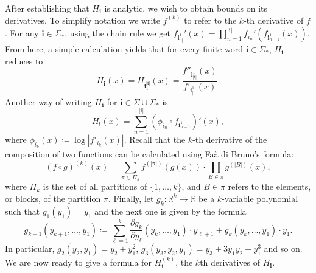 \documentclass[11pt,a4paper]{article}
\theoremstyle{definition}
\theoremstyle{remark}
\renewcommand{\Bbb}[1]{\mathbb{#1}}
\newcommand{\bbR}{{\Bbb R}}        %
\newcommand{\0}{\mathbf{0}}
\newcommand{\bi}{\mathbf{i}}
\numberwithin{equation}{section}
\begin{document}
After establishing that $H_{\bi}$ is analytic, we wish to obtain bounds on its derivatives. To
simplify notation we write $f^{(k)}$ to refer to the $k$-th derivative of $f$. 
For any $\bi\in\Sigma_*$, using the chain rule we get $f_{\bi_{|\bi|}^1}'(x)=
\prod_{n=1}^{|\bi|}f_{i_n}'(f_{\bi_{n-1}^1}(x))$. From here, a simple calculation yields %
that for every finite word $\bi\in\Sigma_*$, $H_{\bi}$ reduces to
\begin{equation}\label{eq:H=f''/f'}
  H_{\bi}(x)=H_{\bi_1^{|\bi|}}(x) = \frac{f''_{\bi_{|\bi|}^1}(x)}{f'_{\bi_{|\bi|}^1}(x)}.
\end{equation}
Another way of writing $H_{\bi}$ for $\bi\in\Sigma\cup\Sigma_*$ is
\begin{equation}
  H_{\bi}(x) = \sum_{n=1}^{|\bi|} (\phi_{i_n}\circ f_{\bi_{n-1}^1})'(x),
  \label{eq:alternativeH}
\end{equation}
where $\phi_{i_k}(x)\coloneqq \log|f'_{i_k}(x)|$. Recall that the $k$-th derivative of the
composition of two functions can be calculated using Fa\`a di Bruno's formula:
\begin{equation}\label{eq:FaaDiBruno}
  (f\circ g)^{(k)}(x) = \sum_{\pi\in \Pi_k} f^{(|\pi|)}(g(x)) \cdot \prod_{B\in\pi}
  g^{(|B|)}(x),
\end{equation}
where $\Pi_k$ is the set of all partitions of $\{1,\dots,k\}$, and $B\in \pi$ refers to the
elements, or blocks, of the partition $\pi$. Finally, let $g_k:\bbR^k\to \bbR$ be a $k$-variable
polynomial such that $g_1(y_1)=y_1$ and the next one is given by the formula
\[
g_{k+1}(y_{k+1},\dots,y_1)\coloneqq \sum_{\ell=1}^k \frac{\partial g_k}{\partial
y_{\ell}}(y_k,\dots,y_1)\cdot y_{\ell+1} +
g_k(y_k,\dots,y_1)\cdot y_1.
\]
In particular, $g_2(y_2,y_1)=y_2+y_1^2$, $g_3(y_3,y_2,y_1) = y_3+3y_1y_2+y_1^3$ and so on. We are
now ready to give a formula for $H_{\bi}^{(k)}$, the $k$th derivatives of $H_{\bi}$.
\end{document}
